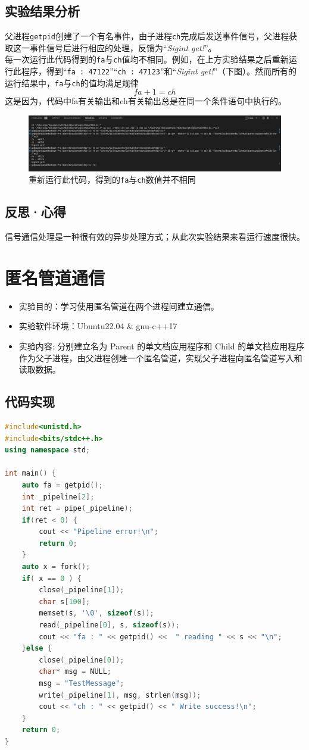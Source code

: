 \documentclass[UTF8]{ctexart}
\begin{document}
\subsection{实验结果分析}
父进程\texttt{getpid}创建了一个有名事件，由子进程\texttt{ch}完成后发送事件信号，父进程获取这一事件信号后进行相应的处理，反馈为“\textit{Sigint get!}”。\\
每一次运行此代码得到的\texttt{fa}与\texttt{ch}值均不相同。例如，在上方实验结果之后重新运行此程序，得到“\texttt{fa : 47122}”“\texttt{ch : 47123}”和“\textit{Sigint get!}”（下图）。然而所有的运行结果中，\texttt{fa}与\texttt{ch}的值均满足规律
\begin{equation}
	fa + 1 = ch
\end{equation}
这是因为，代码中fa有关输出和ch有关输出总是在同一个条件语句中执行的。
\begin{figure}[htbp]
	\begin{center}
		\includegraphics[width=0.8\pdfpagewidth]{os3-2.png}
	\end{center}
	\caption{重新运行此代码，得到的\texttt{fa}与\texttt{ch}数值并不相同}
\end{figure}
\subsection{反思·心得}
信号通信处理是一种很有效的异步处理方式；从此次实验结果来看运行速度很快。
\clearpage
\section{匿名管道通信}
\begin{itemize}
	\item 实验目的：学习使用匿名管道在两个进程间建立通信。
	\item 实验软件环境：Ubuntu22.04 \& gnu-c++17
	\item 实验内容: 分别建立名为 Parent 的单文档应用程序和 Child 的单文档应用程序作为父子进程，由父进程创建一个匿名管道，实现父子进程向匿名管道写入和读取数据。
\end{itemize}
\subsection{代码实现}
\begin{lstlisting}[language=c++]
#include<unistd.h>
#include<bits/stdc++.h>
using namespace std;

int main() {
	auto fa = getpid();
	int _pipeline[2];
	int ret = pipe(_pipeline);
	if(ret < 0) {
		cout << "Pipeline error!\n";
		return 0;
	}
	auto x = fork();
	if( x == 0 ) {
		close(_pipeline[1]);
		char s[100];
		memset(s, '\0', sizeof(s));
		read(_pipeline[0], s, sizeof(s));
		cout << "fa : " << getpid() <<  " reading " << s << "\n";
	}else {
		close(_pipeline[0]);
		char* msg = NULL;
		msg = "TestMessage";
		write(_pipeline[1], msg, strlen(msg));
		cout << "ch : " << getpid() << " Write success!\n";
	} 
	return 0;
}
\end{lstlisting}
\end{document}
